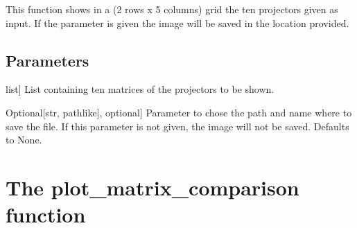 \documentclass[letterpaper,10pt,english]{sphinxmanual}
\begin{document}
\begin{fulllineitems}
\label{\detokenize{index:hicanalysis.visualizegraph.show_10_projectors}}
\pysigstartsignatures
{}
\pysigstopsignatures
\sphinxAtStartPar
This function shows in a (2 rows x 5 columns) grid the ten projectors given as input.
If the parameter  is given the image will be saved in the location provided.


\subsection{Parameters}
\label{\detokenize{index:id20}}\begin{description}
\sphinxlineitem{projectors}{[}list{]}
\sphinxAtStartPar
List containing ten matrices of the projectors to be shown.

\sphinxlineitem{savepath}{[}Optional{[}str, path\sphinxhyphen{}like{]}, optional{]}
\sphinxAtStartPar
Parameter to chose the path and name where to save the file. If this
parameter is not given, the image will not be saved. Defaults to None.

\end{description}

\end{fulllineitems}



\section{The plot\_matrix\_comparison function}
\label{\detokenize{index:the-plot-matrix-comparison-function}}
\end{document}
